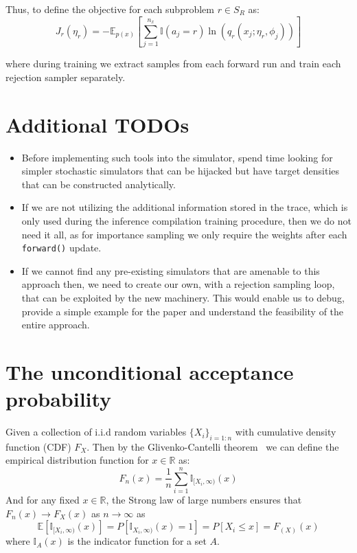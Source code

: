 \documentclass{article}
\begin{document}
Thus, to define the objective for each subproblem $r  \in S_{R}$ as:
\begin{equation}
  J_{r}(\eta_r) = -\mathbb{E}_{p(x)}[\sum^{n_x}_{j=1}\mathbb{I}(a_j = r)\ln(q_r(x_j;\eta_r, \phi_j))]
\end{equation}

where during training we extract samples from each forward run and train each rejection sampler
separately. 



\section{Additional TODOs}


\begin{itemize}
\item Before implementing such tools into the simulator, spend time looking for simpler stochastic simulators 
that can be hijacked but have target densities that can be constructed analytically. 
\item If we are not utilizing the additional information stored in the trace, which is only used during the inference compilation
training procedure, then we do not need it all, as for importance sampling we only require the weights after each \texttt{forward()}
update. 
\item If we cannot find any pre-existing simulators that are amenable to this approach then, we need to create our own, with
a rejection sampling loop, that can be exploited by the new machinery. This would enable us to debug, provide a simple example 
for the paper and understand the feasibility of the entire approach. 
\end{itemize}



\appendix

\section{The unconditional acceptance probability}

Given a collection of i.i.d random variables $\{X_{i}\}_{i = 1:n}$ with 
cumulative density function (CDF) $F_{X}$. Then by the Glivenko-Cantelli theorem~\cite{tucker1959generalization} 
we can define the empirical distribution function for $x \in \mathbb{R}$ as:
\begin{equation}
  F_{n}(x) = \frac{1}{n}\sum^{n}_{i=1} \mathbb{I}_{[X_{i}, \infty)}(x)
\end{equation}
And for any fixed $x \in \mathbb{R}$, the Strong law of large numbers ensures that 
$F_{n}(x) \rightarrow F_{X}(x)$ as $n \rightarrow \infty$ as 
\begin{equation}
\mathbb{E}[\mathbb{I}_{[X_{i},\infty)}(x)] = 
 P[\mathbb{I}_{X_{i},\infty)}(x) = 1] = P[X_{i}\leq x] = F_(X)(x)
\end{equation}
where $\mathbb{I}_{A}(x)$  is the indicator function for a set $A$. 
\end{document}
